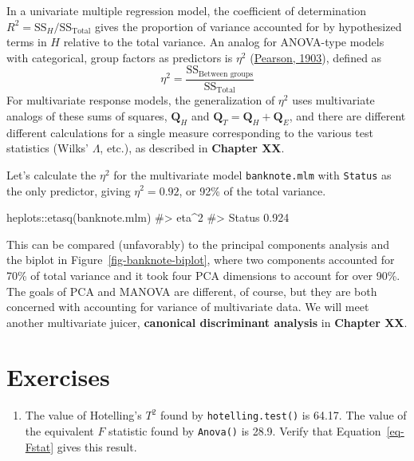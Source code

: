 \documentclass[
  letterpaper,
  10pt,
  krantz2]{krantz}
\makeatletter
\newenvironment{Shaded}{\begin{snugshade}}{\end{snugshade}}
\newcommand{\CommentTok}[1]{\textcolor[rgb]{0.37,0.37,0.37}{#1}}
\newcommand{\FunctionTok}[1]{\textcolor[rgb]{0.28,0.35,0.67}{#1}}
\newcommand{\NormalTok}[1]{\textcolor[rgb]{0.00,0.23,0.31}{#1}}
\newcommand{\SpecialCharTok}[1]{\textcolor[rgb]{0.37,0.37,0.37}{#1}}
\providecommand{\tightlist}{%
  \setlength{\itemsep}{0pt}\setlength{\parskip}{0pt}}\usepackage{longtable,booktabs,array}
\newenvironment{kframe}{%
  \medskip{}
  \setlength{\fboxsep}{.8em}
  \def\at@end@of@kframe{}%
  \ifinner\ifhmode%
  \def\at@end@of@kframe{\end{minipage}}%
  \begin{minipage}{\columnwidth}%
  \fi\fi%
  \def\FrameCommand##1{\hskip\@totalleftmargin \hskip-\fboxsep
  \colorbox{shadecolor}{##1}\hskip-\fboxsep
      \hskip-\linewidth \hskip-\@totalleftmargin \hskip\columnwidth}%
  \MakeFramed {\advance\hsize-\width
    \@totalleftmargin\z@ \linewidth\hsize
    \@setminipage}}%
{\par\unskip\endMakeFramed%
  \at@end@of@kframe}
\renewenvironment{Shaded}{\begin{kframe}}{\end{kframe}}
\makeatother
\begin{document}
In a univariate multiple regression model, the coefficient of
determination \(R^2 = \text{SS}_H / \text{SS}_\text{Total}\) gives the
proportion of variance accounted for by hypothesized terms in \(H\)
relative to the total variance. An analog for ANOVA-type models with
categorical, group factors as predictors is \(\eta^2\)
(\protect\hyperlink{ref-Pearson-1903}{Pearson, 1903}), defined as \[
\eta^2 = \frac{\text{SS}_\text{Between groups}}{\text{SS}_\text{Total}}
\] For multivariate response models, the generalization of \(\eta^2\)
uses multivariate analogs of these sums of squares, \(\mathbf{Q}_H\) and
\(\mathbf{Q}_T = \mathbf{Q}_H + \mathbf{Q}_E\), and there are different
different calculations for a single measure corresponding to the various
test statistics (Wilks' \(\Lambda\), etc.), as described in
\textbf{Chapter XX}.

Let's calculate the \(\eta^2\) for the multivariate model
\texttt{banknote.mlm} with \texttt{Status} as the only predictor, giving
\(\eta^2 = 0.92\), or 92\% of the total variance.

\begin{Shaded}
\begin{Highlighting}[]
\NormalTok{heplots}\SpecialCharTok{::}\FunctionTok{etasq}\NormalTok{(banknote.mlm)}
\CommentTok{\#\textgreater{}        eta\^{}2}
\CommentTok{\#\textgreater{} Status 0.924}
\end{Highlighting}
\end{Shaded}

This can be compared (unfavorably) to the principal components analysis
and the biplot in Figure~\ref{fig-banknote-biplot}, where two components
accounted for 70\% of total variance and it took four PCA dimensions to
account for over 90\%. The goals of PCA and MANOVA are different, of
course, but they are both concerned with accounting for variance of
multivariate data. We will meet another multivariate juicer,
\textbf{canonical discriminant analysis} in \textbf{Chapter XX}.

\hypertarget{exercises}{%
\section{Exercises}\label{exercises}}

\begin{enumerate}
\def\labelenumi{\arabic{enumi}.}
\tightlist
\item
  The value of Hotelling's \(T^2\) found by \texttt{hotelling.test()} is
  64.17. The value of the equivalent \(F\) statistic found by
  \texttt{Anova()} is 28.9. Verify that Equation~\ref{eq-Fstat} gives
  this result.
\end{enumerate}
\end{document}

